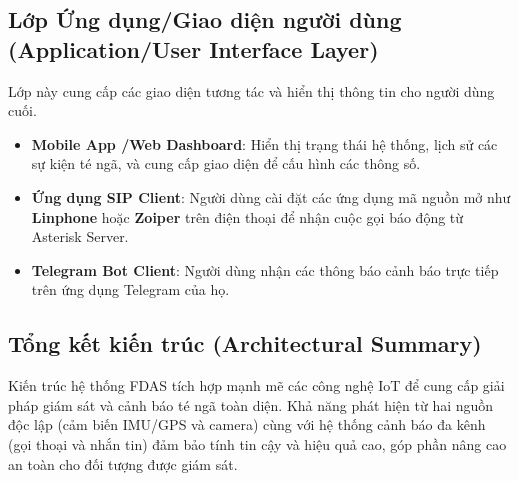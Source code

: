 \subsection{Lớp Ứng dụng\slash Giao diện người dùng (Application\slash User Interface Layer)}
Lớp này cung cấp các giao diện tương tác và hiển thị thông tin cho người dùng cuối.
\begin{itemize}
    \item \textbf{Mobile App \slash Web Dashboard}: Hiển thị trạng thái hệ thống, lịch sử các sự kiện té ngã, và cung cấp giao diện để cấu hình các thông số.
    \item \textbf{Ứng dụng SIP Client}: Người dùng cài đặt các ứng dụng mã nguồn mở như \textbf{Linphone} hoặc \textbf{Zoiper} trên điện thoại để nhận cuộc gọi báo động từ Asterisk Server.
    \item \textbf{Telegram Bot Client}: Người dùng nhận các thông báo cảnh báo trực tiếp trên ứng dụng Telegram của họ.
\end{itemize}

\subsection{Tổng kết kiến trúc (Architectural Summary)}
Kiến trúc hệ thống FDAS tích hợp mạnh mẽ các công nghệ IoT để cung cấp giải pháp giám sát và cảnh báo té ngã toàn diện. Khả năng phát hiện từ hai nguồn độc lập (cảm biến IMU\slash GPS và camera) cùng với hệ thống cảnh báo đa kênh (gọi thoại và nhắn tin) đảm bảo tính tin cậy và hiệu quả cao, góp phần nâng cao an toàn cho đối tượng được giám sát.
